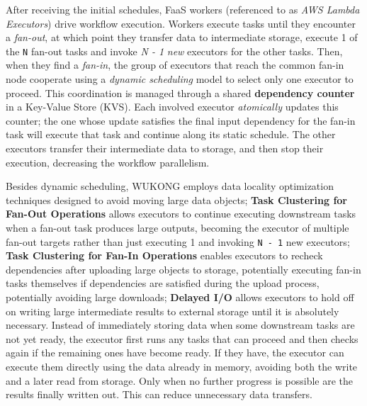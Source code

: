 \documentclass[conference]{IEEEtran}
\begin{document}
After receiving the initial schedules, FaaS workers (referenced to as \textit{AWS Lambda Executors}) drive workflow execution. Workers execute tasks until they encounter a \textit{fan-out}, at which point they transfer data to intermediate storage, execute 1 of the \texttt{N} fan-out tasks and invoke \textit{N - 1} \textit{new} executors for the other tasks. Then, when they find a \textit{fan-in}, the group of executors that reach the common fan-in node cooperate using a \textit{dynamic scheduling} model to select only one executor to proceed. This coordination is managed through a shared \textbf{dependency counter} in a Key-Value Store (KVS). Each involved executor \textit{atomically} updates this counter; the one whose update satisfies the final input dependency for the fan-in task will execute that task and continue along its static schedule. The other executors transfer their intermediate data to storage, and then stop their execution, decreasing the workflow parallelism.

Besides dynamic scheduling, WUKONG employs data locality optimization techniques designed to avoid moving large data objects; \textbf{Task Clustering for Fan-Out Operations} allows executors to continue executing downstream tasks when a fan-out task produces large outputs, becoming the executor of multiple fan-out targets rather than just executing 1 and invoking \texttt{N - 1} new executors; \textbf{Task Clustering for Fan-In Operations} enables executors to recheck dependencies after uploading large objects to storage, potentially executing fan-in tasks themselves if dependencies are satisfied during the upload process, potentially avoiding large downloads; \textbf{Delayed I/O} allows executors to hold off on writing large intermediate results to external storage until it is absolutely necessary. Instead of immediately storing data when some downstream tasks are not yet ready, the executor first runs any tasks that can proceed and then checks again if the remaining ones have become ready. If they have, the executor can execute them directly using the data already in memory, avoiding both the write and a later read from storage. Only when no further progress is possible are the results finally written out. This can reduce unnecessary data transfers.
\end{document}
